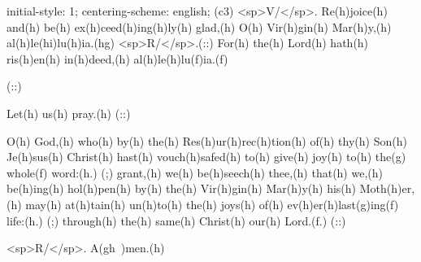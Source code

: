 initial-style: 1;
centering-scheme: english;
(c3) <sp>V/</sp>. Re(h)joice(h) and(h) be(h) ex(h)ceed(h)ing(h)ly(h) glad,(h) O(h) Vir(h)gin(h) Mar(h)y,(h) al(h)le(hi)lu(h)ia.(hg) <sp>R/</sp>.(::) For(h) the(h) Lord(h) hath(h) ris(h)en(h) in(h)deed,(h) al(h)le(h)lu(f)ia.(f)

(::)

Let(h) us(h) pray.(h) (::)

O(h) God,(h) who(h) by(h) the(h) Res(h)ur(h)rec(h)tion(h) of(h) thy(h) Son(h) Je(h)sus(h) Christ(h) hast(h) vouch(h)safed(h) to(h) give(h) joy(h) to(h) the(g) whole(f) word:(h.) (;) grant,(h) we(h) be(h)seech(h) thee,(h) that(h) we,(h) be(h)ing(h) hol(h)pen(h) by(h) the(h) Vir(h)gin(h) Mar(h)y(h) his(h) Moth(h)er,(h) may(h) at(h)tain(h) un(h)to(h) the(h) joys(h) of(h) ev(h)er(h)last(g)ing(f) life:(h.) (;) through(h) the(h) same(h) Christ(h) our(h) Lord.(f.) (::)

<sp>R/</sp>. A(gh~)men.(h)